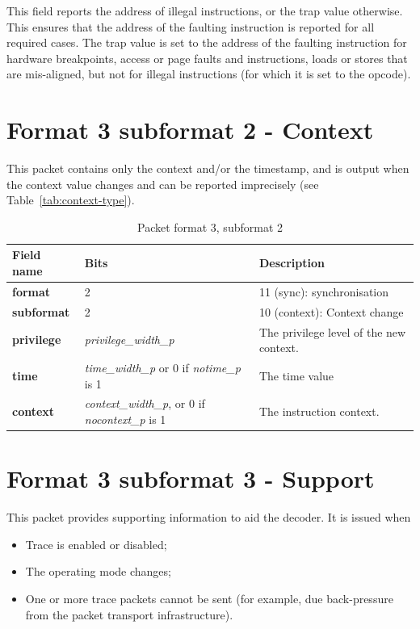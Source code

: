 This field reports the address of illegal instructions, or the trap value otherwise.  This ensures that
the address of the faulting instruction is reported for all required cases.  The trap value 
is set to the address of the faulting instruction for hardware breakpoints, access or page faults and 
instructions, loads or stores that are mis-aligned, but not for illegal instructions (for which it is set to the opcode).

\FloatBarrier
\section{Format 3 subformat 2 - Context} \label{sec:format32}

This packet contains only the context and/or the timestamp, and is output when the context value 
changes and can be reported imprecisely (see Table~\ref{tab:context-type}).

\begin{table}[htp]
  \centering
  \caption{Packet format 3, subformat 2}
  \label{tab:te_inst3-2}
  \begin{tabulary}{\textwidth}{|l|p{35mm}|p{90mm}|}
    \hline
    {\bf Field name} & {\bf Bits} & {\bf Description} \\
    \hline
    \textbf{format} & 2 & 11 (sync): synchronisation\\
    \hline
    \textbf{subformat}  & 2 & 10 (context): Context change \\
    \hline
    \textbf{privilege} & \textit {privilege\_width\_p} & 
                The privilege level of the new context.\\
    \hline
    \textbf{time} &  \textit {time\_width\_p} or 0 if \textit {notime\_p} is 1 & 
               The time value \\
    \hline
    \textbf{context} &  \textit {context\_width\_p}, or 0 if \textit {nocontext\_p} is 1 & The instruction context. \\
    \hline
  \end{tabulary}
\end{table}

\section{Format 3 subformat 3 - Support} \label{sec:format33}

This packet provides supporting information to aid the decoder.  It is issued when

\begin{itemize}
  \item Trace is enabled or disabled;
  \item The operating mode changes;
  \item One or more trace packets cannot be sent (for example, due back-pressure from the packet transport infrastructure).
\end{itemize}


